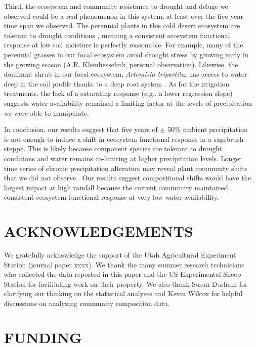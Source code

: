 \documentclass[fleqn,10pt,lineno]{wlpeerj} %
\begin{document}
Third, the ecosystem and community resistance to drought and deluge we
observed could be a real phenomenon in this system, at least over the
five year time span we observed. The perennial plants in this cold
desert ecosystem are tolerant to drought conditions \citep[A.R.
Kleinhesselink, unpublished data]{Bazzaz1979, Franks2011}, meaning a
consistent ecosystem functional response at low soil moisture is
perfectly reasonable. For example, many of the perennial grasses in our
focal ecosystem avoid drought stress by growing early in the growing
season (A.R. Kleinhesselink, personal observation). Likewise, the
dominant shrub in our focal ecosystem, \emph{Artemisia tripartita}, has
access to water deep in the soil profile thanks to a deep root system
\citep{Germino2014}. As for the irrigation treatments, the lack of a
saturating response (e.g., a lower regression slope) suggests water
availability remained a limiting factor at the levels of precipitation
we were able to manipulate.

In conclusion, our results suggest that five years of \(\pm\) 50\%
ambient precipitation is not enough to induce a shift in ecosystem
functional response in a sagebrush steppe. This is likely because
component species are tolerant to drought conditions and water remains
co-limiting at higher precipitation levels. Longer time series of
chronic precipitation alteration may reveal plant community shifts that
we did not observe \citep[e.g.,][]{Wilcox2016}. Our results suggest
compositional shifts would have the largest impact at high rainfall
because the current community maintained consistent ecosystem functional
response at very low water availability.

\section{ACKNOWLEDGEMENTS}\label{acknowledgements}

We gratefully acknowledge the support of the Utah Agricultural
Experiment Station (journal paper xxxx). We thank the many summer
research technicians who collected the data reported in this paper and
the US Experimental Sheep Station for facilitating work on their
property. We also thank Susan Durham for clarifying our thinking on the
statistical analyses and Kevin Wilcox for helpful discussions on
analyzing community composition data.

\section{FUNDING}\label{funding}
\end{document}
